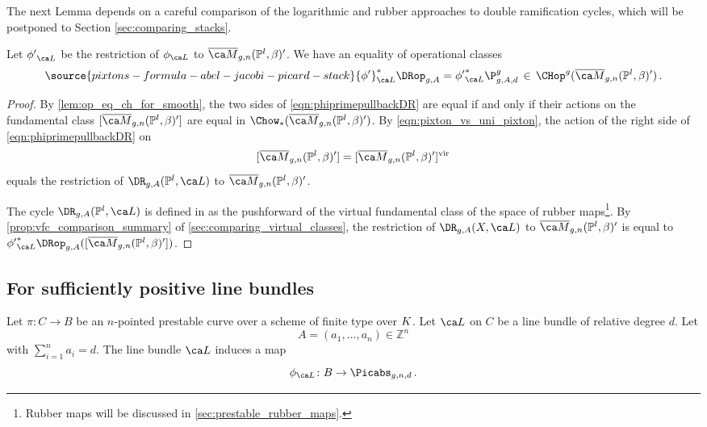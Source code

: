 The next Lemma depends on a careful comparison of the logarithmic and rubber approaches to double ramification cycles, which will be postponed to Section \ref{sec:comparing_stacks}.
\begin{lemma}
\notready\label{cor:operational_equality_projective}\label{lem:projective_space_comparison}
Let ${\phi'}_{\ca L}$ be the restriction of ${\phi}_{\ca L}$ to $\Mbar_{g,n}(\mathbb{P}^l,\beta)'$. We have an equality of operational classes
\begin{equation} \label{eqn:phiprimepullbackDR}
\source{pixtons-formula-abel-jacobi-picard-stack}
{\phi'}_{\ca L}^*\DRop_{g,A}=
{\phi'}_{\ca L}^*{\P_{g,A,d}^g}  \, \in \, \CHop^g(\Mbar_{g,n}(\mathbb{P}^l,\beta)')\, .
\end{equation}
\end{lemma}
\begin{proof}

By \cref{lem:op_eq_ch_for_smooth}, the two sides of  \eqref{eqn:phiprimepullbackDR} are equal if and only if their actions on the fundamental class $[\Mbar_{g,n}(\mathbb{P}^l,\beta)']$ are equal in $\Chow_*(\Mbar_{g,n}(\mathbb{P}^l,\beta)')$.
By  \eqref{eqn:pixton_vs_uni_pixton}, the action of the right side of \eqref{eqn:phiprimepullbackDR} on
$$[\Mbar_{g,n}(\mathbb{P}^l,\beta)']=[\Mbar_{g,n}(\mathbb{P}^l,\beta)']^\textup{vir}$$
equals the restriction of $\DR_{g,A}(\mathbb{P}^l,\ca L)$ to
$\Mbar_{g,n}(\mathbb{P}^l,\beta)'$.

The cycle $\DR_{g,A}(\mathbb{P}^l,\ca L)$
is defined in \cite{Janda2018Double-ramifica} as the pushforward of the virtual fundamental class of the space of rubber maps{\footnote{Rubber maps will
be discussed in \cref{sec:prestable_rubber_maps}.}}.
By \cref{prop:vfc_comparison_summary} of
\cref{sec:comparing_virtual_classes}, the restriction of
$\DR_{g,A}(X,\ca L)$ to $\Mbar_{g,n}(\mathbb{P}^l,\beta)'$ is equal to ${\phi'}_{\ca L}^*\DRop_{g,A}( [\Mbar_{g,n}(\mathbb{P}^l,\beta)'])$.

\end{proof}





\subsection{For sufficiently positive line bundles}\label{sec:positive_line_bundle}

Let $\pi\colon C\to B$ be an $n$-pointed prestable curve over a scheme of finite type over ${K}$. Let
$\ca L$ on $C$ be a line bundle
of relative degree $d$.
Let $$A = (a_1,\ldots, a_n) \in\mathbb{Z}^n$$ with $\sum_{i=1}^n a_i = d$.
The line bundle $\ca L$ induces a map
$$\phi_{\ca L} \colon B \to \Picabs_{g,n,d}\, .$$

